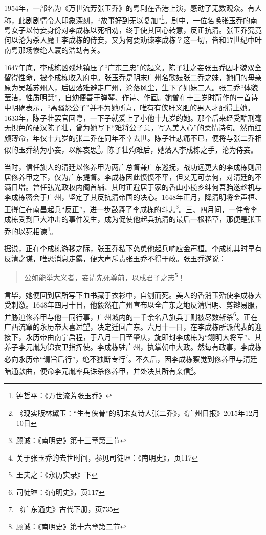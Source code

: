 \indent 1954年，一部名为《万世流芳张玉乔》的粤剧在香港上演，感动了无数观众。有人称，此剧剧情令人印象深刻，“故事好到无以复加”\footnote{钟哲平：《万世流芳张玉乔》}。剧中，一位名唤张玉乔的南粤女子以侍妾身份对李成栋以死相劝，终于使其回心转意，反正抗清。张玉乔究竟何以沦为杀人魔王李成栋的侍妾，又为何要劝谏李成栋？这一切，皆和17世纪中叶南粤那场惨绝人寰的浩劫有关。

1647年底，李成栋凶残地镇压了“广东三忠”的起义。陈子壮之妾张玉乔因才貌双全留得性命，被李成栋收入府中。张玉乔是明末广州名歌妓张二乔之妹，她们的母亲原为吴越苏州人，后因落难避走广州，沦落风尘，生下了姐妹二人。张二乔“体貌莹洁，性质明慧”，自幼便善于弹琴、作诗、作画。她曾在十三岁时所作的一首诗中明确表示，“离骚怨公子”并不为她所喜，唯有有侠肝义胆的男人才配得上她。1633年，陈子壮罢官回粤，一下子就爱上了小他十九岁的她。那个后来经受酷刑毫无惧色的硬汉陈子壮，曾为她写下“难将公子意，写入美人心”的柔情诗句。然而红颜薄命，年仅十九岁的张二乔在同年不幸去世。陈子壮悲痛不已，便将与张二乔相似的玉乔纳为小妾，以解哀思\footnote{《现实版林黛玉：“生有侠骨”的明末女诗人张二乔》，《广州日报》2015年12月10日}。陈子壮殉难后，她落入李成栋之手，沦为侍妾。

当时，信任旗人的清廷以佟养甲为两广总督兼广东巡抚，战功远更大的李成栋则屈居佟养甲之下，仅为广东提督。李成栋因此愤愤不平，但又无可奈何，对清廷的不满日增。曾任弘光政权内阁首辅、其时正避居于家的香山小榄乡绅何吾驺遂趁机与李成栋密会于广州，坚定了其反抗清帝国的决心。1648年正月，降清明将金声桓、王得仁在南昌起兵“反正”，进一步鼓舞了李成栋的斗志\footnote{顾诚：《南明史》第十三章第三节}。三、四月间，一件令李成栋受到巨大冲击的事件发生，成为促使他起兵抗清的最后一根稻草，那便是张玉乔的以死相谏\footnote{关于张玉乔的去世时间，参见司徒琳：《南明史》，页117}。

据说，正在李成栋游移之际，张玉乔私下怂恿他起兵响应金声桓。李成栋其时早有反清之谋，唯恐消息走露，便大声斥责张玉乔不得干政。张玉乔遂说：

\begin{quote}

公如能举大义者，妾请先死尊前，以成君子之志\footnote{王夫之：《永历实录》下}！

\end{quote}


言毕，她便回到居所写下血书藏于衣衫中，自刎而死。美人的香消玉殆使李成栋大受刺激。1648年四月十日，他毅然在广州宣布以全广东之地反清归明、剪辫易服，并胁迫佟养甲与他一同行事，广州城内的一千余名八旗兵丁则被尽数斩杀\footnote{司徒琳：《南明史》，页117}。正在广西流窜的永历帝大喜过望，决定迁回广东。六月十一日，在李成栋所派代表的迎接下，永历帝由南宁启程，于八月一日至肇庆，旋即封李成栋为“翊明大将军”、其养子李元胤为锦衣卫指挥使。李成栋驻广州，执掌朝中大政。然每有政事，李成栋必向永历帝“请旨后行”，绝不独断专行\footnote{《广东通史》古代下册，页735}。不久后，因李成栋察觉到佟养甲与清廷暗通款曲，便命李元胤率兵诛杀佟养甲，并处决其所有亲信\footnote{顾诚：《南明史》第十六章第二节}。

